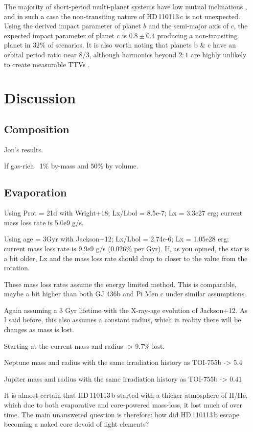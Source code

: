 \documentclass[fleqn,usenatbib]{mnras}
\newcommand{\Tplanet}{HD\,110113\,b}
\newcommand{\Tplanetc}{HD\,110113\,c}
\begin{document}
The majority of short-period multi-planet systems have low mutual inclinations \citep{lissauer2011architecture}, and in such a case the non-transiting nature of \Tplanetc{} is not unexpected.
Using the derived impact parameter of planet $b$ and the semi-major axis of $c$, the expected impact parameter of planet c is $0.8\pm0.4$ producing a non-transiting planet in $32\%$ of scenarios.
It is also worth noting that planets b \& c have an orbital period ratio near 8/3, although harmonics beyond $2:1$ are highly unlikely to create measurable TTVs \citep{deck2015measurement}.

\section{Discussion}
\subsection{Composition}
Jon's results.

If gas-rich ~1\% by-mass and 50\% by volume.

\subsection{Evaporation}
Using Prot = 21d with Wright+18; Lx/Lbol = 8.5e-7; Lx = 3.3e27 erg; current mass loss rate is 5.0e9 g/s.

Using age = 3Gyr with Jackson+12; Lx/Lbol = 2.74e-6; Lx = 1.05e28 erg; current mass loss rate is 9.9e9 g/s (0.026\% per Gyr).
If, as you opined, the star is a bit older, Lx and the mass loss rate should drop to closer to the value from the rotation.

These mass loss rates assume the energy limited method. This is comparable, maybe a bit higher than both GJ 436b and Pi Men c under similar assumptions.

Again assuming a 3 Gyr lifetime with the X-ray-age evolution of Jackson+12. As I said before, this also assumes a constant radius, which in reality there will be changes as mass is lost.


Starting at the current mass and radius -> 9.7\% lost.

Neptune mass and radius with the same irradiation history as TOI-755b -> 5.4%

Jupiter mass and radius with the same irradiation history as TOI-755b -> 0.41%

It is almost certain that \Tplanet{} started with a thicker atmosphere of H/He, which due to both evaporative and core-powered mass-loss, it lost much of over time.
The main unanswered question is therefore: how did \Tplanet{} escape becoming a naked core devoid of light elements?
\end{document}
